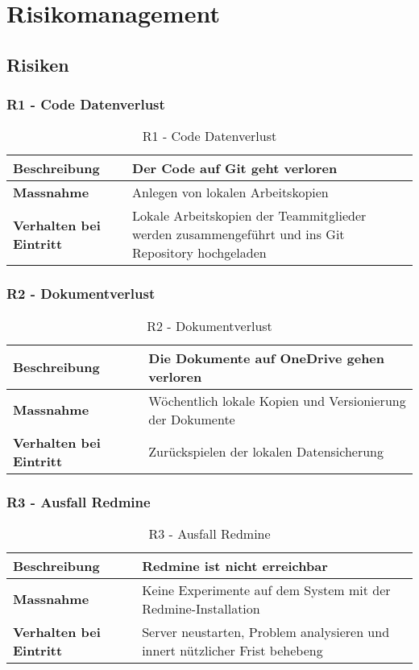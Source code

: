 \section{Risikomanagement}
\subsection{Risiken}
\subsubsection{R1 - Code Datenverlust}
\begin{table}[H]
    \centering
    \def\arraystretch{2}
    \begin{tabular}{| p{4.5cm} | p{13.5cm} |} \hline
        \textbf{Beschreibung} & Der Code auf Git geht verloren \\ \hline
        \textbf{Massnahme} & Anlegen von lokalen Arbeitskopien  \\ \hline
        \textbf{Verhalten bei Eintritt} & Lokale Arbeitskopien der Teammitglieder werden zusammengeführt und ins Git Repository hochgeladen \\ \hline 
    \end{tabular}
    \caption{R1 - Code Datenverlust}
\end{table}

\subsubsection{R2 - Dokumentverlust}
\begin{table}[H]
    \centering
    \def\arraystretch{2}
    \begin{tabular}{| p{4.5cm} | p{13.5cm} |} \hline
        \textbf{Beschreibung} & Die Dokumente auf OneDrive gehen verloren \\ \hline
        \textbf{Massnahme} & Wöchentlich lokale Kopien und Versionierung der Dokumente  \\ \hline
        \textbf{Verhalten bei Eintritt} & Zurückspielen der lokalen Datensicherung \\ \hline 
    \end{tabular}
    \caption{R2 - Dokumentverlust}
\end{table}

\subsubsection{R3 - Ausfall Redmine}
\begin{table}[H]
    \centering
    \def\arraystretch{2}
    \begin{tabular}{| p{4.5cm} | p{13.5cm} |} \hline
        \textbf{Beschreibung} & Redmine ist nicht erreichbar\\ \hline
        \textbf{Massnahme} & Keine Experimente auf dem System mit der Redmine-Installation  \\ \hline
        \textbf{Verhalten bei Eintritt} & Server neustarten, Problem analysieren und innert nützlicher Frist behebeng \\ \hline 
    \end{tabular}
    \caption{R3 - Ausfall Redmine}
\end{table}

